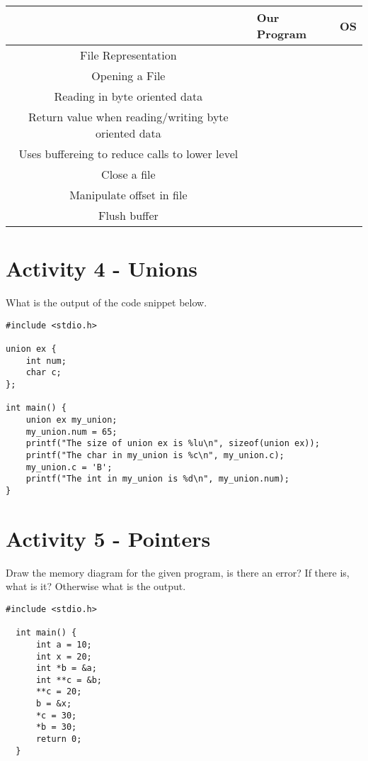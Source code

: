 \documentclass[]{article}
\begin{document}
\begin{centering}
    \begin{tabular}{|c|p{4cm}|p{5cm}|}
        \hline
        & Our Program & OS \\
        \hline
        File Representation & & \\
        \hline
        Opening a File & & \\
        \hline
        Reading in byte oriented data & & \\
        \hline
        Return value when reading/writing byte oriented data & & \\
        \hline
        Uses buffereing to reduce calls to lower level & & \\
        \hline
        Close a file & & \\
        \hline
        Manipulate offset in file & & \\
        \hline
        Flush buffer & & \\
        \hline
    \end{tabular}
\end{centering}

\section*{Activity 4 - Unions}
What is the output of the code snippet below.

\begin{lstlisting}
#include <stdio.h>

union ex {
    int num;
    char c;
};

int main() {
    union ex my_union;
    my_union.num = 65;
    printf("The size of union ex is %lu\n", sizeof(union ex));
    printf("The char in my_union is %c\n", my_union.c);
    my_union.c = 'B';
    printf("The int in my_union is %d\n", my_union.num);
}
\end{lstlisting}

\section*{Activity 5 - Pointers}
Draw the memory diagram for the given program, is there an error? If there is, what is it? Otherwise
what is the output.
\begin{lstlisting}
#include <stdio.h>

  int main() {
      int a = 10;
      int x = 20;
      int *b = &a;
      int **c = &b;
      **c = 20;
      b = &x;
      *c = 30;
      *b = 30;
      return 0;
  }
\end{lstlisting}
\end{document}
